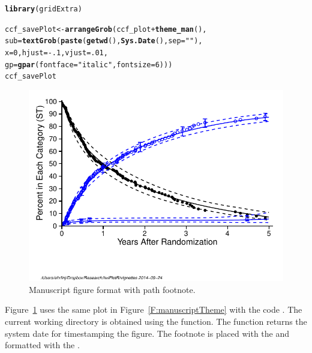 \documentclass[nojss]{jss}\usepackage[]{graphicx}\usepackage[]{color}
\makeatletter
\def\maxwidth{ %
  \ifdim\Gin@nat@width>\linewidth
    \linewidth
  \else
    \Gin@nat@width
  \fi
}
\newcommand{\hlnum}[1]{\textcolor[rgb]{0.686,0.059,0.569}{#1}}%
\newcommand{\hlstr}[1]{\textcolor[rgb]{0.192,0.494,0.8}{#1}}%
\newcommand{\hlopt}[1]{\textcolor[rgb]{0,0,0}{#1}}%
\newcommand{\hlstd}[1]{\textcolor[rgb]{0.345,0.345,0.345}{#1}}%
\newcommand{\hlkwb}[1]{\textcolor[rgb]{0.69,0.353,0.396}{#1}}%
\newcommand{\hlkwc}[1]{\textcolor[rgb]{0.333,0.667,0.333}{#1}}%
\newcommand{\hlkwd}[1]{\textcolor[rgb]{0.737,0.353,0.396}{\textbf{#1}}}%
\newenvironment{kframe}{%
 \def\at@end@of@kframe{}%
 \ifinner\ifhmode%
  \def\at@end@of@kframe{\end{minipage}}%
  \begin{minipage}{\columnwidth}%
 \fi\fi%
 \def\FrameCommand##1{\hskip\@totalleftmargin \hskip-\fboxsep
 \colorbox{shadecolor}{##1}\hskip-\fboxsep
     \hskip-\linewidth \hskip-\@totalleftmargin \hskip\columnwidth}%
 \MakeFramed {\advance\hsize-\width
   \@totalleftmargin\z@ \linewidth\hsize
   \@setminipage}}%
 {\par\unskip\endMakeFramed%
 \at@end@of@kframe}
\newenvironment{knitrout}{}{} %
\makeatother
\begin{document}
\begin{knitrout}\footnotesize
{}\color{fgcolor}\begin{kframe}
\begin{alltt}
\hlkwd{library}\hlstd{(gridExtra)}

\hlstd{ccf_savePlot} \hlkwb{<-} \hlkwd{arrangeGrob}\hlstd{(ccf_plot}\hlopt{+}\hlkwd{theme_man}\hlstd{(),}
                            \hlkwc{sub} \hlstd{=} \hlkwd{textGrob}\hlstd{(}\hlkwd{paste}\hlstd{(}\hlkwd{getwd}\hlstd{(),} \hlkwd{Sys.Date}\hlstd{(),} \hlkwc{sep}\hlstd{=}\hlstr{" "}\hlstd{),}
                                           \hlkwc{x} \hlstd{=} \hlnum{0}\hlstd{,} \hlkwc{hjust} \hlstd{=} \hlopt{-}\hlnum{.1}\hlstd{,} \hlkwc{vjust}\hlstd{=}\hlnum{.01}\hlstd{,}
                                           \hlkwc{gp} \hlstd{=} \hlkwd{gpar}\hlstd{(}\hlkwc{fontface} \hlstd{=} \hlstr{"italic"}\hlstd{,} \hlkwc{fontsize} \hlstd{=} \hlnum{6}\hlstd{)))}
\hlstd{ccf_savePlot}
\end{alltt}
\end{kframe}\begin{figure}[htpb]


{\centering \includegraphics[width=\maxwidth]{figure/beamer-manuscriptFootnote} 

}

\caption[Manuscript figure format with path footnote]{Manuscript figure format with path footnote.\label{F:manuscriptFootnote}}
\end{figure}


\end{knitrout}
Figure~\ref{F:manuscriptFootnote} uses the same plot in Figure~\ref{F:manuscriptTheme} with the code . The current working directory is obtained using the  function. The  function returns the system date for timestamping the figure. The footnote is placed with the  and formatted with the .
\end{document}
